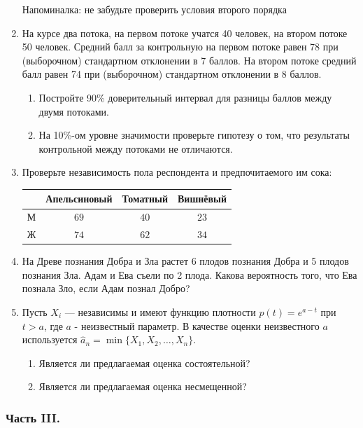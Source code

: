 \begin{enumerate}
Напоминалка: не забудьте проверить условия второго порядка

\item На курсе два потока, на первом потоке учатся 40 человек, на втором
потоке 50 человек. Средний балл за контрольную на первом потоке
равен 78 при (выборочном) стандартном отклонении в 7 баллов. На
втором потоке средний балл равен 74 при (выборочном) стандартном
отклонении в 8 баллов.
\begin{enumerate}
\item Постройте 90\% доверительный интервал для разницы баллов между
двумя потоками.
\item На 10\%-ом уровне значимости проверьте гипотезу о том, что
результаты контрольной между потоками не отличаются.
\end{enumerate}


\item Проверьте независимость пола респондента и предпочитаемого
им сока:

\begin{tabular}{@{}cccc@{}}
\toprule
  & Апельсиновый & Томатный & Вишнёвый \\ \midrule
М & $69$         & $40$     & $23$     \\
Ж & $74$         & $62$     & $34$     \\ \bottomrule
\end{tabular}

\item На Древе познания Добра и Зла растет 6 плодов познания Добра и 5 плодов познания Зла. Адам и Ева съели по 2 плода. Какова вероятность того, что Ева познала Зло, если Адам познал Добро?

\item Пусть $X_{i}$ — независимы и имеют функцию плотности $p(t)=e^{a-t}$ при $t>a$, где $a$ - неизвестный параметр. В качестве оценки неизвестного $a$ используется $\hat{a}_{n}=\min\{X_{1},X_{2}, \ldots, X_{n}\}$.
\begin{enumerate}
\item Является ли предлагаемая оценка состоятельной?
\item Является ли предлагаемая оценка несмещенной?
\end{enumerate}


\end{enumerate}

\subsubsection*{Часть III.}

